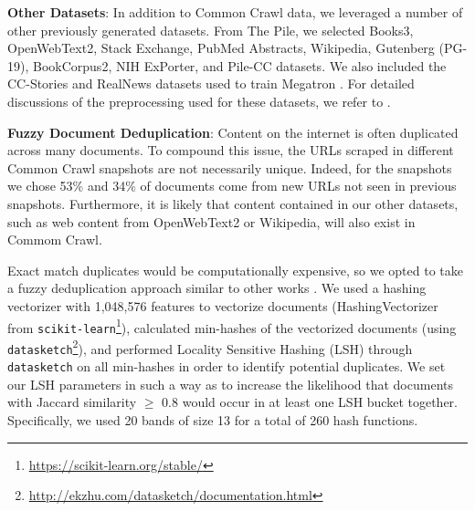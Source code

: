 \documentclass[11pt]{article}
\begin{document}



\textbf{Other Datasets}: In addition to Common Crawl data, we leveraged a number of other previously generated datasets. From The Pile, we selected Books3, OpenWebText2, Stack Exchange, PubMed Abstracts, Wikipedia, Gutenberg (PG-19), BookCorpus2, NIH ExPorter, and Pile-CC datasets. We also included the CC-Stories and RealNews datasets used to train Megatron \citep{megatron-DBLP:journals/corr/abs-1909-08053}. For detailed discussions of the preprocessing used for these datasets, we refer to \cite{pile-dataset-2020}.

\textbf{Fuzzy Document Deduplication}: Content on the internet is often duplicated across many documents. To compound this issue, the URLs scraped in different Common Crawl snapshots are not necessarily unique. Indeed, for the snapshots we chose 53\% and 34\% of documents come from new URLs not seen in previous snapshots. Furthermore, it is likely that content contained in our other datasets, such as web content from OpenWebText2 or Wikipedia, will also exist in Commom Crawl.

Exact match duplicates would be computationally expensive,
so we opted to take a fuzzy deduplication approach similar to other works \citep{brown2020language,pile-dataset-2020}. We used a hashing vectorizer with 1,048,576 features to vectorize documents (HashingVectorizer from \texttt{scikit-learn}\footnote{\url{https://scikit-learn.org/stable/}}), calculated min-hashes of the vectorized documents (using \texttt{datasketch}\footnote{\url{http://ekzhu.com/datasketch/documentation.html}}), and performed Locality Sensitive Hashing (LSH) through \texttt{datasketch} on all min-hashes in order to identify potential duplicates. We set our LSH parameters in such a way as to increase the likelihood that documents with Jaccard similarity $\ge$ 0.8 would occur in at least one LSH bucket together. Specifically, we used 20 bands of size 13 for a total of 260 hash functions.
\end{document}
